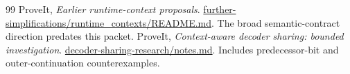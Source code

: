 \documentclass[11pt,letterpaper]{article}
\theoremstyle{definition}\newtheorem{definition}[theorem]{Definition}
\theoremstyle{remark}\newtheorem{remark}[theorem]{Remark}
\newcommand{\PinnedURL}{https://github.com/VladimirReshetnikov/ProveIt/blob/6f0d42d368506bc29c70ace1c992ed88b2651346}
\begin{document}
\begin{thebibliography}{99}
 ProveIt, \emph{Earlier runtime-context proposals}. \href{\PinnedURL/Computability/BusyBeaver/Research/ZFC/k225-formal/verification/k215/simplification/proposals/further-simplifications/runtime_contexts/README.md}{further-simplifications/runtime\_contexts/README.md}. The broad semantic-contract direction predates this packet.
 ProveIt, \emph{Context-aware decoder sharing: bounded investigation}. \href{\PinnedURL/Computability/BusyBeaver/Research/ZFC/k225-formal/decoder-sharing-research/notes.md}{decoder-sharing-research/notes.md}. Includes predecessor-bit and outer-continuation counterexamples.
\end{thebibliography}
\end{document}

